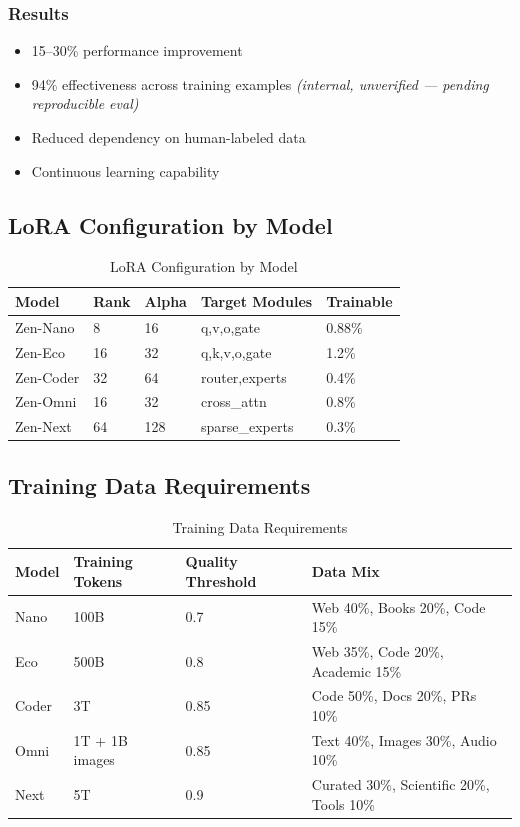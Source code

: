 \documentclass[11pt,a4paper]{article}
\begin{document}
\subsubsection{Results}
\begin{itemize}
    \item 15--30\% performance improvement
    \item 94\% effectiveness across training examples \textit{(internal, unverified --- pending reproducible eval)}
    \item Reduced dependency on human-labeled data
    \item Continuous learning capability
\end{itemize}

\subsection{LoRA Configuration by Model}

\begin{table}[H]
\centering
\begin{tabular}{lllll}
\toprule
\textbf{Model} & \textbf{Rank} & \textbf{Alpha} & \textbf{Target Modules} & \textbf{Trainable} \\
\midrule
Zen-Nano & 8 & 16 & q,v,o,gate & 0.88\% \\
Zen-Eco & 16 & 32 & q,k,v,o,gate & 1.2\% \\
Zen-Coder & 32 & 64 & router,experts & 0.4\% \\
Zen-Omni & 16 & 32 & cross\_attn & 0.8\% \\
Zen-Next & 64 & 128 & sparse\_experts & 0.3\% \\
\bottomrule
\end{tabular}
\caption{LoRA Configuration by Model}
\end{table}

\subsection{Training Data Requirements}

\begin{table}[H]
\centering
\begin{tabular}{llll}
\toprule
\textbf{Model} & \textbf{Training Tokens} & \textbf{Quality Threshold} & \textbf{Data Mix} \\
\midrule
Nano & 100B & 0.7 & Web 40\%, Books 20\%, Code 15\% \\
Eco & 500B & 0.8 & Web 35\%, Code 20\%, Academic 15\% \\
Coder & 3T & 0.85 & Code 50\%, Docs 20\%, PRs 10\% \\
Omni & 1T + 1B images & 0.85 & Text 40\%, Images 30\%, Audio 10\% \\
Next & 5T & 0.9 & Curated 30\%, Scientific 20\%, Tools 10\% \\
\bottomrule
\end{tabular}
\caption{Training Data Requirements}
\end{table}
\end{document}
